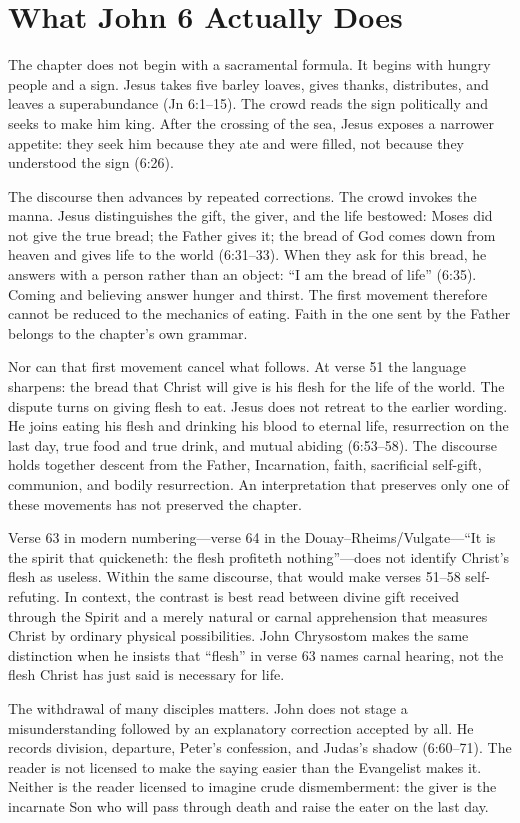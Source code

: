 \section{What John 6 Actually Does}

The chapter does not begin with a sacramental formula. It begins with hungry
people and a sign. Jesus takes five barley loaves, gives thanks, distributes,
and leaves a superabundance (Jn 6:1--15). The crowd reads the sign politically
and seeks to make him king. After the crossing of the sea, Jesus exposes a
narrower appetite: they seek him because they ate and were filled, not because
they understood the sign (6:26).

The discourse then advances by repeated corrections. The crowd invokes the
manna. Jesus distinguishes the gift, the giver, and the life bestowed: Moses
did not give the true bread; the Father gives it; the bread of God comes down
from heaven and gives life to the world (6:31--33). When they ask for this
bread, he answers with a person rather than an object: ``I am the bread of
life'' (6:35). Coming and believing answer hunger and thirst. The first movement
therefore cannot be reduced to the mechanics of eating. Faith in the one sent
by the Father belongs to the chapter's own grammar.

Nor can that first movement cancel what follows. At verse 51 the language
sharpens: the bread that Christ will give is his flesh for the life of the
world. The dispute turns on giving flesh to eat. Jesus does not retreat to the
earlier wording. He joins eating his flesh and drinking his blood to eternal
life, resurrection on the last day, true food and true drink, and mutual
abiding (6:53--58). The discourse holds together descent from the Father,
Incarnation, faith, sacrificial self-gift, communion, and bodily resurrection.
An interpretation that preserves only one of these movements has not preserved
the chapter.

Verse 63 in modern numbering---verse 64 in the
Douay--Rheims/Vulgate---``It is the spirit that quickeneth: the flesh profiteth
nothing''---does not identify Christ's flesh as useless. Within the same
discourse, that would make verses 51--58 self-refuting. In context, the
contrast is best read between divine gift received through the Spirit and a
merely natural or carnal apprehension that measures Christ by ordinary
physical possibilities. John Chrysostom makes the
same distinction when he insists that ``flesh'' in verse 63 names carnal
hearing, not the flesh Christ has just said is necessary for life.

The withdrawal of many disciples matters. John does not stage a misunderstanding
followed by an explanatory correction accepted by all. He records division,
departure, Peter's confession, and Judas's shadow (6:60--71). The reader is not
licensed to make the saying easier than the Evangelist makes it. Neither is the
reader licensed to imagine crude dismemberment: the giver is the incarnate Son
who will pass through death and raise the eater on the last day.

